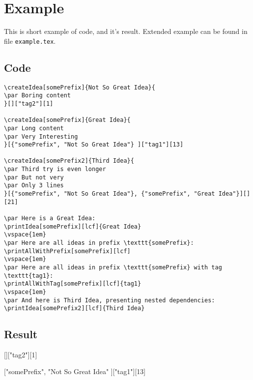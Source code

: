 \documentclass[11pt]{article}
\begin{document}
\section{Example}
\par This is short example of code, and it's result. Extended example can be found in file \texttt{example.tex}.
\subsection{Code}
\begin{verbatim}
\createIdea[somePrefix]{Not So Great Idea}{
\par Boring content
}[]["tag2"][1]

\createIdea[somePrefix]{Great Idea}{
\par Long content
\par Very Interesting
}[{"somePrefix", "Not So Great Idea"} ]["tag1"][13]

\createIdea[somePrefix2]{Third Idea}{
\par Third try is even longer
\par But not very
\par Only 3 lines
}[{"somePrefix", "Not So Great Idea"}, {"somePrefix", "Great Idea"}][][21]

\par Here is a Great Idea:
\printIdea[somePrefix][lcf]{Great Idea}
\vspace{1em}
\par Here are all ideas in prefix \texttt{somePrefix}:
\printAllWithPrefix[somePrefix][lcf]
\vspace{1em}
\par Here are all ideas in prefix \texttt{somePrefix} with tag \texttt{tag1}:
\printAllWithTag[somePrefix][lcf]{tag1}
\vspace{1em}
\par And here is Third Idea, presenting nested dependencies:
\printIdea[somePrefix2][lcf]{Third Idea}

\end{verbatim}
\subsection{Result}

[]["tag2"][1]

[{"somePrefix", "Not So Great Idea"} ]["tag1"][13]
\end{document}
